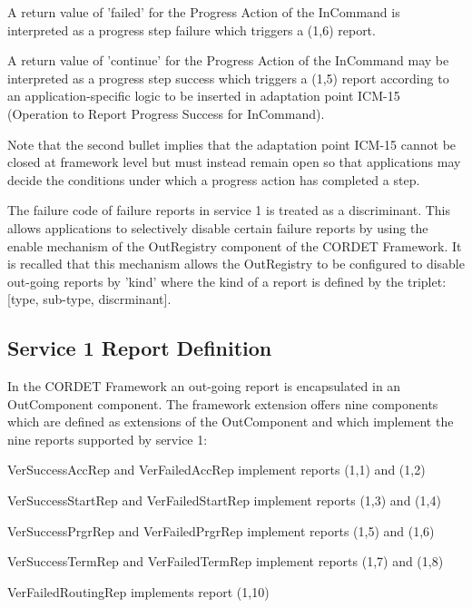 \documentclass[a4paper,10pt]{article}
\newenvironment{fw_itemize}						%
{\begin{itemize}
  \setlength{\itemsep}{1mm}
  \setlength{\parskip}{0pt}
  \setlength{\parsep}{0pt}}
{\end{itemize}}
\begin{document}
\begin{fw_itemize}
\item A return value of 'failed' for the Progress Action of the InCommand is interpreted as a progress step failure which triggers a (1,6) report. 
\item A return value of 'continue' for the Progress Action of the InCommand may be interpreted as a progress step success which triggers a (1,5) report according to an application-specific logic to be inserted in adaptation point ICM-15 (Operation to Report Progress Success for InCommand). 
\end{fw_itemize}

Note that the second bullet implies that the adaptation point ICM-15 cannot be closed at framework level but must instead remain open so that applications may decide the conditions under which a progress action has completed a step.

The failure code of failure reports in service 1 is treated as a discriminant. This allows applications to selectively disable certain failure reports by using the enable mechanism of the OutRegistry component of the CORDET Framework. It is recalled that this mechanism allows the OutRegistry to be configured to disable out-going reports by 'kind' where the kind of a report is defined by the triplet: [type, sub-type, discrminant]. 


\subsection{Service 1 Report Definition}\label{sec:serv1RepDef}
In the CORDET Framework an out-going report is encapsulated in an OutComponent component. The framework extension offers nine components which are defined as extensions of the OutComponent and which implement the nine reports supported by service 1:

\begin{fw_itemize}
\item VerSuccessAccRep and VerFailedAccRep implement reports (1,1) and (1,2) 
\item VerSuccessStartRep and VerFailedStartRep implement reports (1,3) and (1,4) 
\item VerSuccessPrgrRep and VerFailedPrgrRep implement reports (1,5) and (1,6) 
\item VerSuccessTermRep and VerFailedTermRep implement reports (1,7) and (1,8) 
\item VerFailedRoutingRep implements report (1,10)
\end{fw_itemize}
\end{document}
